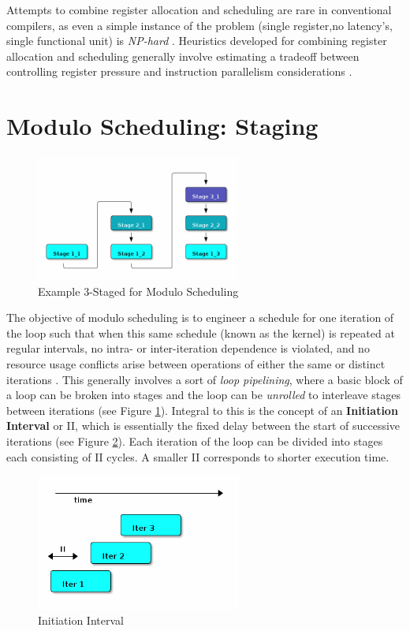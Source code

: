 \documentclass[12pt]{report}
\begin{document}
Attempts to combine register allocation and scheduling are rare in
conventional compilers, as even a simple instance of the problem (single
register,no latency's, single functional unit) is \emph{NP-hard}
\parencite{motwani1995combining} \parencite{Pinter:1993:RAI:173262.155114}.
Heuristics developed for combining register allocation and scheduling
generally involve estimating a tradeoff between controlling register pressure
and instruction parallelism considerations \parencite{motwani1995combining}.

\section{Modulo Scheduling: Staging}
\label{sec:orgdb804cb}
\begin{figure}[htbp]
\centering
\includegraphics[width=0.6\textwidth]{figures/SwingModuloStaging.png}
\caption{\label{fig:SwingStaging}
Example 3-Staged for Modulo Scheduling}
\end{figure}

The objective of modulo scheduling is to engineer a schedule for one
iteration of the loop such that when this same schedule (known as the kernel)
is repeated at regular intervals, no intra- or inter-iteration dependence is
violated, and no resource usage conflicts arise between operations of either
the same or distinct iterations \parencite{rau1996iterative}. This generally
involves a sort of \emph{loop pipelining}, where a basic block of a loop can be
broken into stages and the loop can be \emph{unrolled} to interleave stages
between iterations (see Figure \ref{fig:SwingStaging}). Integral to this is the
concept of an \textbf{Initiation Interval} or II, which is essentially the fixed
delay between the start of successive iterations (see Figure
\ref{fig:InitiationInterval}). Each iteration of the loop can be divided into
stages each consisting of II cycles. A smaller II corresponds to shorter
execution time.

\begin{figure}[htbp]
\centering
\includegraphics[width=0.6\textwidth]{figures/InitiationInterval.png}
\caption{\label{fig:InitiationInterval}
Initiation Interval}
\end{figure}
\end{document}
